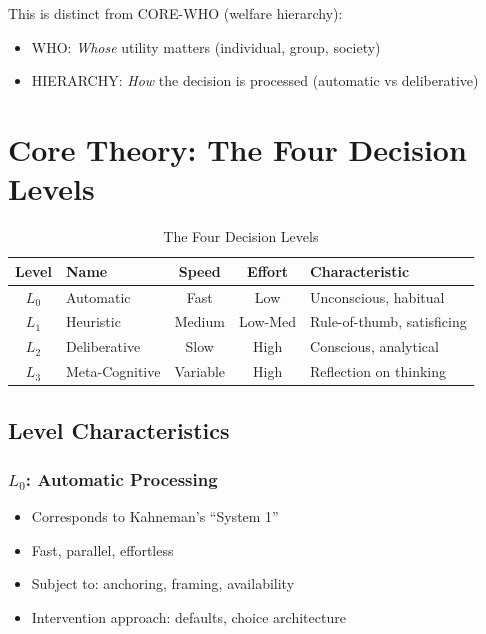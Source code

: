 This is distinct from CORE-WHO (welfare hierarchy):
\begin{itemize}
\item WHO: \textit{Whose} utility matters (individual, group, society)
\item HIERARCHY: \textit{How} the decision is processed (automatic vs deliberative)
\end{itemize}

\section{Core Theory: The Four Decision Levels}
\label{sec:hier-levels}

\begin{table}[htbp]
\centering
\caption{The Four Decision Levels}
\label{tab:hier-levels}
\renewcommand{\arraystretch}{1.4}
\begin{tabular}{@{}clccp{3.5cm}@{}}
\toprule
\textbf{Level} & \textbf{Name} & \textbf{Speed} & \textbf{Effort} & \textbf{Characteristic} \\
\midrule
$L_0$ & Automatic & Fast & Low & Unconscious, habitual \\
$L_1$ & Heuristic & Medium & Low-Med & Rule-of-thumb, satisficing \\
$L_2$ & Deliberative & Slow & High & Conscious, analytical \\
$L_3$ & Meta-Cognitive & Variable & High & Reflection on thinking \\
\bottomrule
\end{tabular}
\end{table}

\subsection{Level Characteristics}

\subsubsection{$L_0$: Automatic Processing}
\begin{itemize}[nosep]
\item Corresponds to Kahneman's ``System 1''
\item Fast, parallel, effortless
\item Subject to: anchoring, framing, availability
\item Intervention approach: defaults, choice architecture
\end{itemize}

